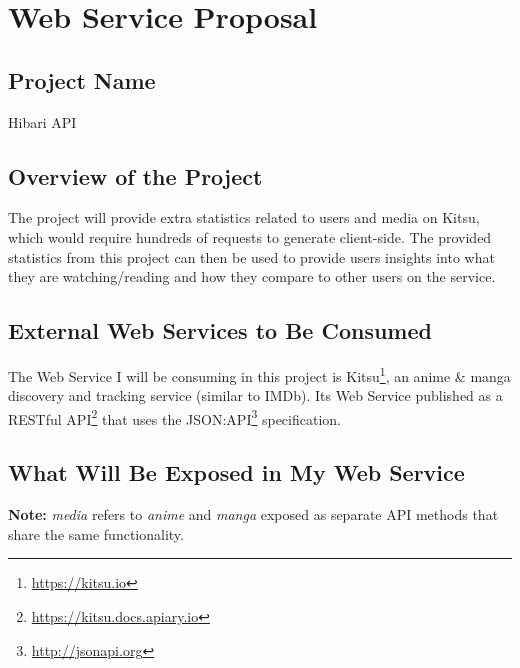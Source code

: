 \chapter{Web Service Proposal}
\section{Project Name}

Hibari API

\section{Overview of the Project}

The project will provide extra statistics related to users and media on Kitsu, which would require hundreds of requests to generate client-side. The provided statistics from this project can then be used to provide users insights into what they are watching/reading and how they compare to other users on the service.

\section{External Web Services to Be Consumed}

The Web Service I will be consuming in this project is Kitsu\footnote{\url{https://kitsu.io}}, an anime \& manga discovery and tracking service (similar to IMDb). Its Web Service published as a RESTful API\footnote{\url{https://kitsu.docs.apiary.io}} that uses the JSON:API\footnote{\url{http://jsonapi.org}} specification.

\section{What Will Be Exposed in My Web Service}

\textbf{Note:} \textit{media} refers to \textit{anime} and \textit{manga} exposed as separate API methods that share the same functionality.

